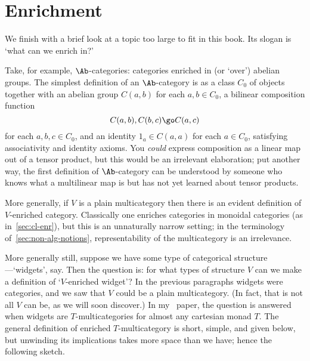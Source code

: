 \section{Enrichment}	

We finish with a brief look at a topic too large to fit in this book.  Its
slogan is `what can we enrich in?'  

Take, for example, $\Ab$-categories:%
%
%
categories enriched in (or `over')
abelian groups.  The simplest definition of an $\Ab$-category is as a class
$C_0$ of objects together with an abelian group $C(a,b)$ for each $a, b \in
C_0$, a bilinear composition function
% 
\[
C(a,b), C(b,c) \go C(a,c)
\]
for each $a,b,c \in C_0$, and an identity $1_a \in C(a,a)$ for each $a \in
C_0$, satisfying associativity and identity axioms.  You \emph{could}
express composition as a linear map out of a tensor product, but this would
be an irrelevant%
%
%
elaboration; put another way, the first definition of
$\Ab$-category can be understood by someone who knows what a multilinear
map is but has not yet learned about tensor products.

More generally, if $V$ is a plain multicategory then there is an evident
definition of $V$-enriched%
%
%
category.  Classically one enriches categories
in monoidal categories (as in~\ref{sec:cl-enr}), but this is an unnaturally
narrow setting; in the terminology of~\ref{sec:non-alg-notions},
representability%
%
%
of the multicategory is an irrelevance.

More generally still, suppose we have some type of categorical
structure---`widgets',
say.  Then the question is: for what types of
structure $V$ can we make a definition of `$V$-enriched%
%
%
widget'?  In the
previous paragraphs widgets were categories, and we saw that $V$ could be a
plain multicategory.  (In fact, that is not all $V$ can be, as we will soon
discover.)  In my~\cite{GECM} paper, the question is answered when widgets
are $T$-multicategories for almost any cartesian monad $T$.  The general
definition of enriched $T$-multicategory is short, simple, and given below,
but unwinding its implications takes more space than we have; hence the
following sketch.

